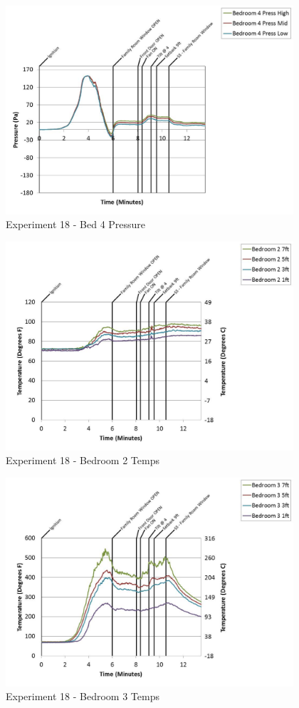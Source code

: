 \documentclass{article}
\begin{document}
\begin{appendices}
	\clearpage

	\begin{figure}[h!]
		\centering
		\includegraphics[height=3.05in]{0_Images/Results_Charts/Exp_18_Charts/Bed4Pressure.pdf}
		\caption{Experiment 18 - Bed 4 Pressure}
	\end{figure}
 

	\begin{figure}[h!]
		\centering
		\includegraphics[height=3.05in]{0_Images/Results_Charts/Exp_18_Charts/Bedroom2Temps.pdf}
		\caption{Experiment 18 - Bedroom 2 Temps}
	\end{figure}
 
	\clearpage

	\begin{figure}[h!]
		\centering
		\includegraphics[height=3.05in]{0_Images/Results_Charts/Exp_18_Charts/Bedroom3Temps.pdf}
		\caption{Experiment 18 - Bedroom 3 Temps}
	\end{figure}
 


\end{appendices}
\end{document}

